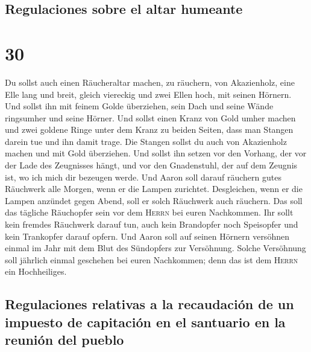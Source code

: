 \hypertarget{regulaciones-sobre-el-altar-humeante}{%
\subsection{Regulaciones sobre el altar
humeante}\label{regulaciones-sobre-el-altar-humeante}}

\hypertarget{section-29}{%
\section{30}\label{section-29}}

 Du sollst auch einen Räucheraltar machen, zu räuchern,
von Akazienholz,  eine Elle lang und breit, gleich
viereckig und zwei Ellen hoch, mit seinen Hörnern.  Und
sollst ihn mit feinem Golde überziehen, sein Dach und seine Wände
ringsumher und seine Hörner. Und sollst einen Kranz von Gold umher
machen  und zwei goldene Ringe unter dem Kranz zu beiden
Seiten, dass man Stangen darein tue und ihn damit trage. 
Die Stangen sollst du auch von Akazienholz machen und mit Gold
überziehen.  Und sollst ihn setzen vor den Vorhang, der
vor der Lade des Zeugnisses hängt, und vor den Gnadenstuhl, der auf dem
Zeugnis ist, wo ich mich dir bezeugen werde.  Und Aaron
soll darauf räuchern gutes Räuchwerk alle Morgen, wenn er die Lampen
zurichtet.  Desgleichen, wenn er die Lampen anzündet gegen
Abend, soll er solch Räuchwerk auch räuchern. Das soll das tägliche
Räuchopfer sein vor dem \textsc{Herrn} bei euren Nachkommen.
 Ihr sollt kein fremdes Räuchwerk darauf tun, auch kein
Brandopfer noch Speisopfer und kein Trankopfer darauf opfern.
 Und Aaron soll auf seinen Hörnern versöhnen einmal im
Jahr mit dem Blut des Sündopfers zur Versöhnung. Solche Versöhnung soll
jährlich einmal geschehen bei euren Nachkommen; denn das ist dem
\textsc{Herrn} ein Hochheiliges.

\hypertarget{regulaciones-relativas-a-la-recaudaciuxf3n-de-un-impuesto-de-capitaciuxf3n-en-el-santuario-en-la-reuniuxf3n-del-pueblo}{%
\subsection{Regulaciones relativas a la recaudación de un impuesto de
capitación en el santuario en la reunión del
pueblo}\label{regulaciones-relativas-a-la-recaudaciuxf3n-de-un-impuesto-de-capitaciuxf3n-en-el-santuario-en-la-reuniuxf3n-del-pueblo}}

